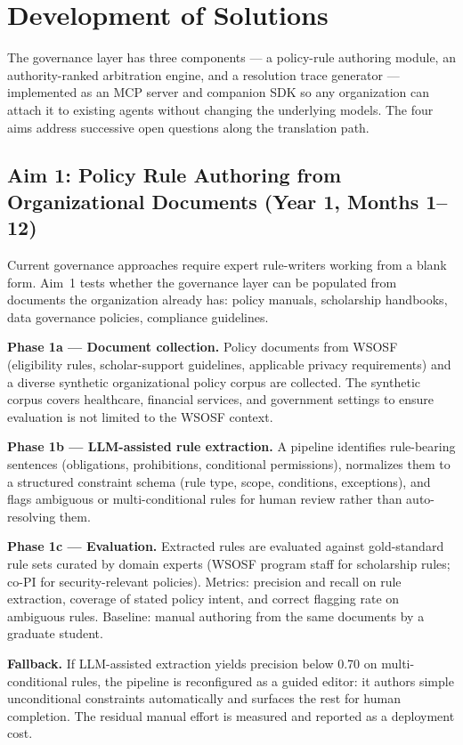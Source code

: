\documentclass[11pt]{article}
\begin{document}
\section{Development of Solutions}

The governance layer has three components --- a policy-rule authoring module, an authority-ranked arbitration engine, and a resolution trace generator --- implemented as an MCP server and companion SDK so any organization can attach it to existing agents without changing the underlying models. The four aims address successive open questions along the translation path.

\subsection{Aim 1: Policy Rule Authoring from Organizational Documents (Year 1, Months 1--12)}

Current governance approaches require expert rule-writers working from a blank form. Aim~1 tests whether the governance layer can be populated from documents the organization already has: policy manuals, scholarship handbooks, data governance policies, compliance guidelines.

\textbf{Phase 1a --- Document collection.} Policy documents from WSOSF (eligibility rules, scholar-support guidelines, applicable privacy requirements) and a diverse synthetic organizational policy corpus are collected. The synthetic corpus covers healthcare, financial services, and government settings to ensure evaluation is not limited to the WSOSF context.

\textbf{Phase 1b --- LLM-assisted rule extraction.} A pipeline identifies rule-bearing sentences (obligations, prohibitions, conditional permissions), normalizes them to a structured constraint schema (rule type, scope, conditions, exceptions), and flags ambiguous or multi-conditional rules for human review rather than auto-resolving them.

\textbf{Phase 1c --- Evaluation.} Extracted rules are evaluated against gold-standard rule sets curated by domain experts (WSOSF program staff for scholarship rules; co-PI for security-relevant policies). Metrics: precision and recall on rule extraction, coverage of stated policy intent, and correct flagging rate on ambiguous rules. Baseline: manual authoring from the same documents by a graduate student.

\textbf{Fallback.} If LLM-assisted extraction yields precision below 0.70 on multi-conditional rules, the pipeline is reconfigured as a guided editor: it authors simple unconditional constraints automatically and surfaces the rest for human completion. The residual manual effort is measured and reported as a deployment cost.
\end{document}
